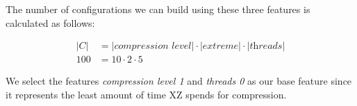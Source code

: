 
The number of configurations we can build using these three features is calculated as follows:

\begin{align}
    \lvert C \rvert &= \lvert \textit{compression level} \rvert \cdot \lvert \textit{extreme} \rvert \cdot \lvert \textit{threads} \rvert \\
    100 &= 10 \cdot 2 \cdot 5 \nonumber
\end{align}

We select the features \emph{compression level 1} and \emph{threads 0} as our base feature since it represents the least amount of time 
\textsc{XZ} spends for compression.
